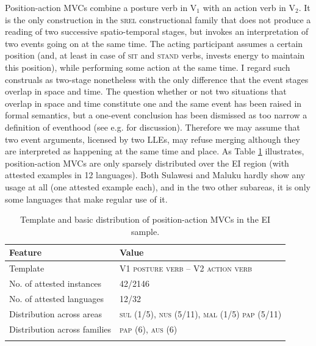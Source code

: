Position-action MVCs combine a posture verb in V$_1$ with an action verb in V$_2$. It is the only construction in the \textsc{srel} constructional family that does not produce a reading of two successive spatio-temporal stages, but invokes an interpretation of two events going on at the same time. The acting participant assumes a certain position (and, at least in case of \textsc{sit} and \textsc{stand} verbs, invests energy to maintain this position), while performing some action at the same time. I regard such construals as two-stage nonetheless with the only difference that the event stages overlap in space and time. The question whether or not two situations that overlap in space and time constitute one and the same event has been raised in formal semantics, but a one-event conclusion has been dismissed as too narrow a definition of eventhood (see e.g. \citealt{maienborn2005limits} for discussion). Therefore we may assume that two event arguments, licensed by two LLEs, may refuse merging although they are interpreted as happening at the same time and place. As Table \ref{table:position-action} illustrates, position-action MVCs are only sparsely distributed over the EI region (with attested examples in 12 languages). Both Sulawesi and Maluku hardly show any usage at all (one attested example each), and in the two other subareas, it is only some languages that make regular use of it.

\begin{table}
\begin{tabular}{ll}
\lsptoprule
Feature&Value\tabularnewline
\hline
Template&V1 \textsc{posture verb} -- V2 \textsc{action verb}\tabularnewline
No. of attested instances& 42/2146 \tabularnewline
No. of attested languages& 12/32 \tabularnewline
Distribution across areas& \textsc{sul} (1/5), \textsc{nus} (5/11), \textsc{mal} (1/5) \textsc{pap} (5/11) \tabularnewline
Distribution across families& \textsc{pap} (6), \textsc{aus} (6) \tabularnewline
\lspbottomrule
\end{tabular}
\caption[Template and basic distribution of position-action MVCs]{Template and basic distribution of position-action MVCs in the EI sample.}
\label{table:position-action}
\end{table}

